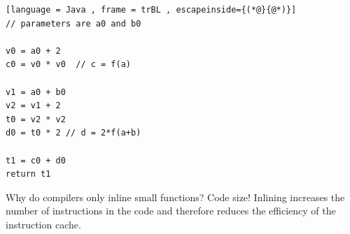 \begin{lstlisting}[language = Java , frame = trBL , escapeinside={(*@}{@*)}]
// parameters are a0 and b0

v0 = a0 + 2
c0 = v0 * v0  // c = f(a)

v1 = a0 + b0
v2 = v1 + 2
t0 = v2 * v2
d0 = t0 * 2 // d = 2*f(a+b)

t1 = c0 + d0
return t1
\end{lstlisting}

Why do compilers only inline small functions? Code size! Inlining increases the number of
instructions in the code and therefore reduces the efficiency of the instruction cache.